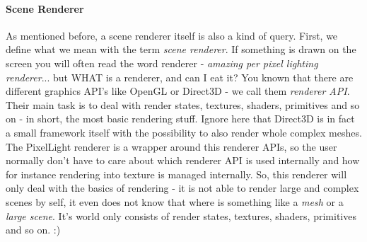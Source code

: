 \paragraph{Scene Renderer}
As mentioned before, a scene renderer itself is also a kind of query. First, we define what we mean with the term \emph{scene renderer}. If something is drawn on the screen you will often read the word renderer - \emph{amazing per pixel lighting renderer}... but WHAT is a renderer, and can I eat it? You known that there are different graphics API's like OpenGL or Direct3D - we call them \emph{renderer API}. Their main task is to deal with render states, textures, shaders, primitives and so on - in short, the most basic rendering stuff. Ignore here that Direct3D is in fact a small framework itself with the possibility to also render whole complex meshes. The PixelLight renderer is a wrapper around this renderer APIs, so the user normally don't have to care about which renderer API is used internally and how for instance rendering into texture is managed internally. So, this renderer will only deal with the basics of rendering - it is not able to render large and complex scenes by self, it even does not know that where is something like a \emph{mesh} or a \emph{large scene}. It's world only consists of render states, textures, shaders, primitives and so on. :)

